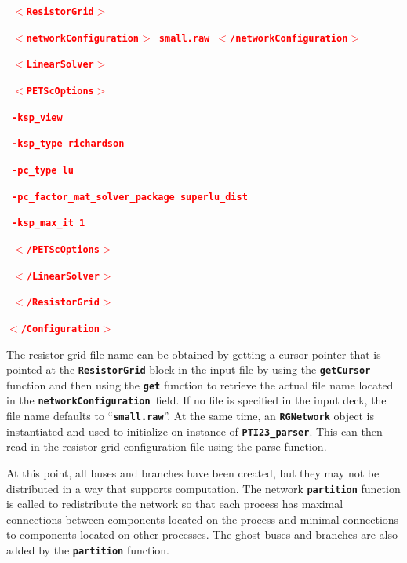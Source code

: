 \documentclass[12pt]{report} %
\begin{document}
\textcolor{red}{\texttt{\textbf{  $\boldsymbol{\mathrm{<}}$ResistorGrid$\boldsymbol{\mathrm{>}}$}}}

\textcolor{red}{\texttt{\textbf{    $\boldsymbol{\mathrm{<}}$networkConfiguration$\boldsymbol{\mathrm{>}}$ small.raw $\boldsymbol{\mathrm{<}}$/networkConfiguration$\boldsymbol{\mathrm{>}}$}}}

\textcolor{red}{\texttt{\textbf{    $\boldsymbol{\mathrm{<}}$LinearSolver$\boldsymbol{\mathrm{>}}$}}}

\textcolor{red}{\texttt{\textbf{      $\boldsymbol{\mathrm{<}}$PETScOptions$\boldsymbol{\mathrm{>}}$}}}

\textcolor{red}{\texttt{\textbf{        -ksp\_view}}}

\textcolor{red}{\texttt{\textbf{        -ksp\_type richardson}}}

\textcolor{red}{\texttt{\textbf{        -pc\_type lu}}}

\textcolor{red}{\texttt{\textbf{        -pc\_factor\_mat\_solver\_package superlu\_dist}}}

\textcolor{red}{\texttt{\textbf{        -ksp\_max\_it 1}}}

\textcolor{red}{\texttt{\textbf{      $\boldsymbol{\mathrm{<}}$/PETScOptions$\boldsymbol{\mathrm{>}}$}}}

\textcolor{red}{\texttt{\textbf{    $\boldsymbol{\mathrm{<}}$/LinearSolver$\boldsymbol{\mathrm{>}}$}}}

\textcolor{red}{\texttt{\textbf{  $\boldsymbol{\mathrm{<}}$/ResistorGrid$\boldsymbol{\mathrm{>}}$}}}

\textcolor{red}{\texttt{\textbf{$\boldsymbol{\mathrm{<}}$/Configuration$\boldsymbol{\mathrm{>}}$}}}

The resistor grid file name can be obtained by getting a cursor pointer that is pointed at the \texttt{\textbf{ResistorGrid}} block in the input file by using the \texttt{\textbf{getCursor}} function and then using the \texttt{\textbf{get}} function to retrieve the actual file name located in the \texttt{\textbf{networkConfiguration }}field. If no file is specified in the input deck, the file name defaults to ``\texttt{\textbf{small.raw}}''. At the same time, an \texttt{\textbf{RGNetwork}} object is instantiated and used to initialize on instance of \texttt{\textbf{PTI23\_parser}}. This can then read in the resistor grid configuration file using the parse function.

At this point, all buses and branches have been created, but they may not be distributed in a way that supports computation. The network \texttt{\textbf{partition}} function is called to redistribute the network so that each process has maximal connections between components located on the process and minimal connections to components located on other processes. The ghost buses and branches are also added by the \texttt{\textbf{partition}} function.
\end{document}
